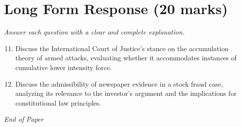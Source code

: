 \documentclass[12pt]{article}
\begin{document}
\section*{Long Form Response (20 marks)}
\textit{Answer each question with a clear and complete explanation.}
\begin{enumerate}[label=\arabic*.]
\setcounter{enumi}{10}
\item Discuss the International Court of Justice's stance on the accumulation theory of armed attacks, evaluating whether it accommodates instances of cumulative lower intensity force.
\item Discuss the admissibility of newspaper evidence in a stock fraud case, analyzing its relevance to the investor's argument and the implications for constitutional law principles.
\end{enumerate}

\vfill
\noindent\textit{End of Paper}
\end{document}

